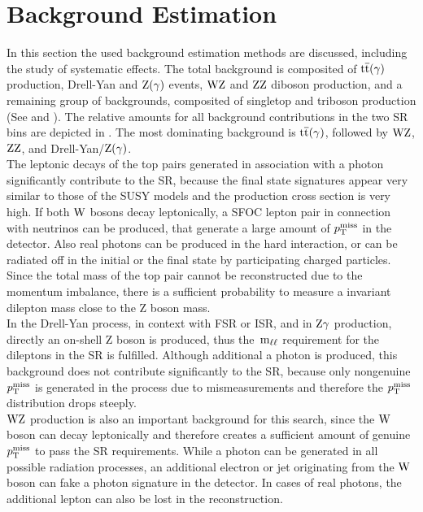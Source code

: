 \section{Background Estimation}\label{sec:BKG}
In this section the used background estimation methods are discussed, including the study of systematic effects. The total background is composited of ${\mathrm{t}\overline{\mathrm{t}}}(\gamma)$ production, Drell-Yan and $\mathrm{Z}(\gamma)$ events, $\mathrm{W}\mathrm{Z}$ and $\mathrm{Z}\mathrm{Z}$ diboson production, and a remaining group of backgrounds, composited of \eg singletop and triboson production (See  and ). The relative amounts for all background contributions in the two SR bins are depicted in . The most dominating background is ${\mathrm{t}\overline{\mathrm{t}}}(\gamma)$, followed by $\mathrm{W}\mathrm{Z}$, $\mathrm{Z}\mathrm{Z}$, and Drell-Yan/$\mathrm{Z}(\gamma)$.\\
The leptonic decays of the top pairs generated in association with a photon significantly contribute to the SR, because the final state signatures appear very similar to those of the SUSY models and the production cross section is very high. If both $\mathrm{W}$ bosons decay leptonically, a SFOC lepton pair in connection with neutrinos can be produced, that generate a large amount of $p_{\mathrm{T}}^\text{miss}$ in the detector. Also real photons can be produced in the hard interaction, or can be radiated off in the initial or the final state by participating charged particles. Since the total mass of the top pair cannot be reconstructed due to the momentum imbalance, there is a sufficient probability to measure a invariant dilepton mass close to the Z boson mass.\\
In the Drell-Yan process, in context with FSR or ISR, and in $\mathrm{Z}\gamma$ production, directly an on-shell Z boson is produced, thus the $\,\text{m}_{\ell\ell}$ requirement for the dileptons in the SR is fulfilled. Although additional a photon is produced, this background does not contribute significantly to the SR, because only nongenuine $p_{\mathrm{T}}^\text{miss}$ is generated in the process due to mismeasurements and therefore the $p_{\mathrm{T}}^\text{miss}$ distribution drops steeply.\\
$\mathrm{W}\mathrm{Z}$ production is also an important background for this search, since the $\mathrm{W}$ boson can decay leptonically and therefore creates a sufficient amount of genuine $p_{\mathrm{T}}^\text{miss}$ to pass the SR requirements. While a photon can be generated in all possible radiation processes, an additional electron or jet originating from the $\mathrm{W}$ boson can fake a photon signature in the detector. In cases of real photons, the additional lepton can also be lost in the reconstruction.\\
